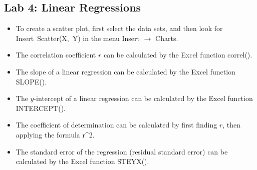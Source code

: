 \hypertarget{lab-4-linear-regressions}{%
\subsection{Lab 4: Linear Regressions}\label{lab-4-linear-regressions}}

\begin{itemize}
\item
  To create a scatter plot, first select the data sets, and then look
  for \textsf{Insert\ Scatter(X,\ Y)} in the menu
  \textsf{Insert} $\rightarrow$ \textsf{Charts}.
\item
  The correlation coefficient \(r\) can be calculated by the Excel
  function \textsf{correl()}.
\item
  The slope of a linear regression can be calculated by the Excel
  function \textsf{SLOPE()}.
\item
  The \(y\)-intercept of a linear regression can be calculated by the
  Excel function \textsf{INTERCEPT()}.
\item
  The coefficient of determination can be calculated by first finding
  \(r\), then applying the formula \textsf{r\^{}2}.
\item
  The standard error of the regression (residual standard error) can be
  calculated by the Excel function \textsf{STEYX()}.
\end{itemize}

